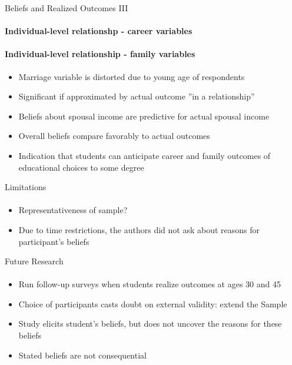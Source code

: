 \documentclass[12pt]{beamer}
\begin{document}
\begin{frame}{Beliefs and Realized Outcomes III}
    \framesubtitle{Individual-level relationshp - career variables}
\end{frame}

\begin{frame}
    \framesubtitle{Individual-level relationship - family variables}
    \begin{itemize}
        \item Marriage variable is distorted due to young age of respondents
        \item Significant if approximated by actual outcome ”in a relationship”
        \item Beliefs about spousal income are predictive for actual spousal income
        \vspace{0.5cm}
        \item Overall beliefs compare favorably to actual outcomes
        \item Indication that students can anticipate career and family outcomes of educational choices to some degree
    \end{itemize}
\end{frame}

\begin{frame}{Limitations}
    \framesubtitle{} 
    \begin{itemize}
        \item Representativeness of sample?
        \item Due to time restrictions, the authors did not ask about reasons for participant's beliefs
    \end{itemize}
\end{frame}

\begin{frame}{Future Research}
    \framesubtitle{} 
    \begin{itemize}
        \item Run follow-up surveys when students realize outcomes at ages 30 and 45
        \item Choice of participants casts doubt on external validity: extend the Sample
        \item Study elicits student's beliefs, but does not uncover the reasons for these beliefs
        \item Stated beliefs are not consequential
    \end{itemize}
\end{frame}
\end{document}
